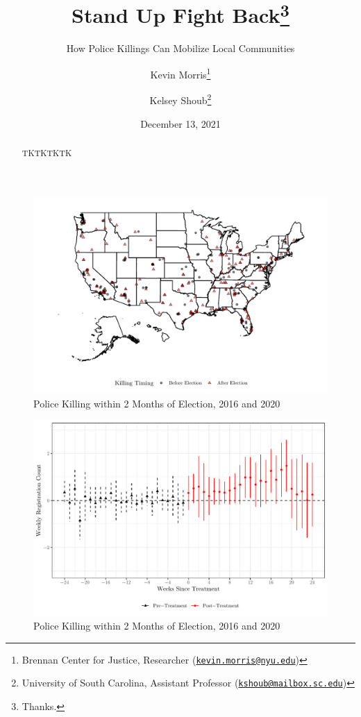 \documentclass[
  12pt,
]{article}
\title{Stand Up Fight Back\thanks{Thanks.}}
\subtitle{How Police Killings Can Mobilize Local Communities}
\author{Kevin Morris\footnote{Brennan Center for Justice, Researcher (\href{mailto:kevin.morris@nyu.edu}{\nolinkurl{kevin.morris@nyu.edu}})} \and Kelsey Shoub\footnote{University of South Carolina, Assistant Professor (\href{mailto:kshoub@mailbox.sc.edu}{\nolinkurl{kshoub@mailbox.sc.edu}})}}
\date{December 13, 2021}
\begin{document}
\maketitle
\begin{abstract}
TKTKTKTK
\end{abstract}

\pagebreak
\doublespacing


\begin{figure}[h]

{\centering \includegraphics{shoot_to_files/figure-latex/map-1} 

}

\caption{\label{fig:map}Police Killing within 2 Months of Election, 2016 and 2020}\label{fig:map}
\end{figure}

\begin{figure}[h]

{\centering \includegraphics{shoot_to_files/figure-latex/did-length-1} 

}

\caption{\label{fig:map}Police Killing within 2 Months of Election, 2016 and 2020}\label{fig:did-length}
\end{figure}
\end{document}
